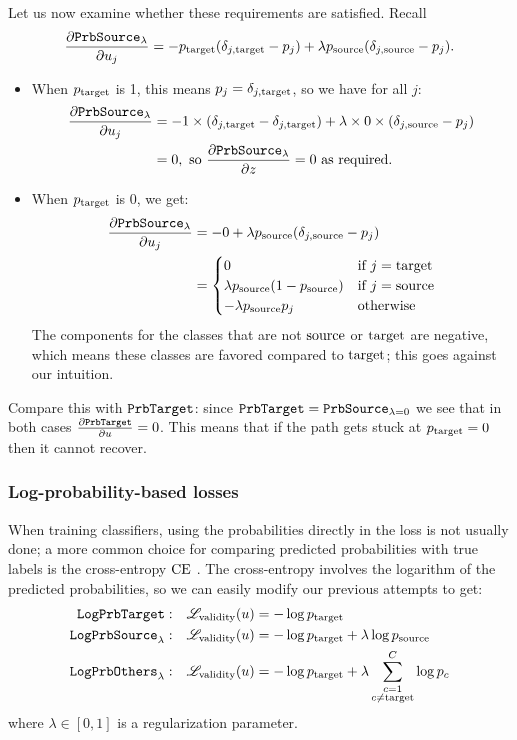 \documentclass[../main.tex]{subfiles}
\begin{document}
Let us now examine whether these requirements are satisfied. Recall
\begin{align*}
    \frac{\partial \mathtt{PrbSource}_{\lambda}}{\partial u_j}
    = - p_{\mathrm{target}} (\delta_{j, \mathrm{target}} - p_j) + \lambda p_{\mathrm{source}} (\delta_{j, \mathrm{source}} - p_j).
\end{align*}
\begin{itemize}
    \item When $p_{\mathrm{target}}$ is 1, this means $p_j = \delta_{j, \mathrm{target}}$, so we have for all $j$:
         \begin{align*}
              \frac{\partial \mathtt{PrbSource}_{\lambda}}{\partial u_j}
              &= -1 \times (\delta_{j, \mathrm{target}} -\delta_{j, \mathrm{target}}) + \lambda \times 0 \times (\delta_{j, \mathrm{source}} - p_j) \\
              &= 0,\text{ so }  \frac{\partial \mathtt{PrbSource}_{\lambda}}{\partial z} = 0 \text{ as required.}
         \end{align*}
    \item When $p_{\mathrm{target}}$ is 0, we get:
         \begin{align*}
              \frac{\partial \mathtt{PrbSource}_{\lambda}}{\partial u_j}
               & = -0 + \lambda p_{\mathrm{source}} (\delta_{j, \mathrm{source}} - p_j)                        \\
               & = \begin{cases}
                    0                                 & \text{if } j = \mathrm{target} \\
                    \lambda p_{\mathrm{source}} (1 - p_{\mathrm{source}}) & \text{if } j = \mathrm{source} \\
                    - \lambda p_{\mathrm{source}} p_j           & \text{otherwise}
               \end{cases}
         \end{align*}
         The components for the classes that are not $\mathrm{source}$ or $\mathrm{target}$ are negative, which means these classes are favored compared to $\mathrm{target}$;
         this goes against our intuition.
\end{itemize}

Compare this with $\mathtt{PrbTarget}$: since $\mathtt{PrbTarget} = \mathtt{PrbSource}_{\lambda=0}$ we see that in both cases $\frac{\partial \mathtt{PrbTarget}}{\partial u} = 0$.
This means that if the path gets stuck at $p_{\mathrm{target}} = 0$ then it cannot recover.

\subsubsection{Log-probability-based losses}

When training classifiers, using the probabilities directly in the loss is not usually done; a more common choice
for comparing predicted probabilities with true labels is the cross-entropy $\text{CE}$ \cite{murphyMachine2012}.
The cross-entropy involves the logarithm of the predicted probabilities, so we can easily modify our previous attempts to get:
\begin{align*}
    \mathtt{LogPrbTarget}{}:        & \quad    \mathscr{L}_\text{validity}(u) = - \log p_{\mathrm{target}}                              \\
    \mathtt{LogPrbSource}_{\lambda}: & \quad    \mathscr{L}_\text{validity}(u) = - \log p_{\mathrm{target}} + \lambda \log p_{\mathrm{source}}    \\
    \mathtt{LogPrbOthers}_{\lambda}: & \quad    \mathscr{L}_\text{validity}(u) = - \log p_{\mathrm{target}} + \lambda \sum_{\substack{{c}=1 \\ {c} \neq \mathrm{target}}}^C \log p_c
\end{align*}
where $\lambda \in [0, 1]$ is a regularization parameter.
\end{document}
